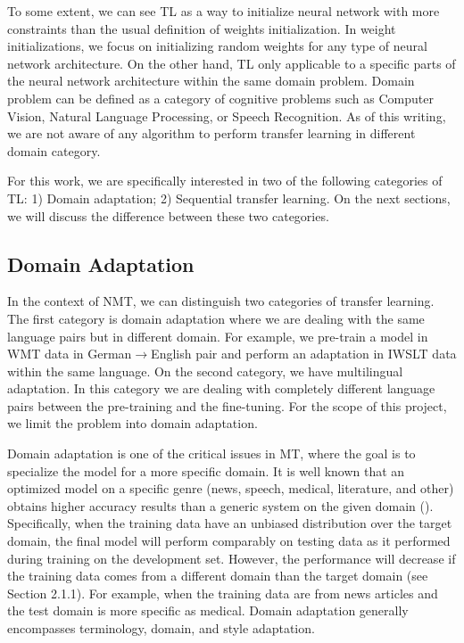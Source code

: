 To some extent, we can see TL as a way to initialize neural network with more constraints than the usual definition of weights initialization. In weight initializations, we focus on initializing random weights for any type of neural network architecture. On the other hand, TL only applicable to a specific parts of the neural network architecture within the same domain problem. Domain problem can be defined as a category of cognitive problems such as Computer Vision, Natural Language Processing, or Speech Recognition. As of this writing, we are not aware of any algorithm to perform transfer learning in different domain category.

For this work, we are specifically interested in two of the following categories of TL: 1) Domain adaptation; 2) Sequential transfer learning. On the next sections, we will discuss the difference between these two categories.

\subsection{Domain Adaptation}
In the context of NMT, we can distinguish two categories of transfer learning. The first category is domain adaptation where we are dealing with the same language pairs but in different domain. For example, we pre-train a model in WMT data in German$\rightarrow$English pair and perform an adaptation in IWSLT data within the same language. On the second category, we have multilingual adaptation. In this category we are dealing with completely different language pairs between the pre-training and the fine-tuning. For the scope of this project, we limit the problem into domain adaptation.

Domain adaptation is one of the critical issues in MT, where the goal is to specialize the model for a more specific domain. It is well known that an optimized model on a specific genre (news, speech, medical, literature, and other) obtains higher accuracy results than a generic system on the given domain (\cite{gao2002improving,hildebrand2005adaptation}). Specifically, when the training data have an unbiased distribution over the target domain, the final model will perform comparably on testing data as it performed during training on the development set. However, the performance will decrease if the training data comes from a different domain than the target domain (see Section 2.1.1). For example, when the training data are from news articles and the test domain is more specific as medical. Domain adaptation generally encompasses terminology, domain, and style adaptation.

